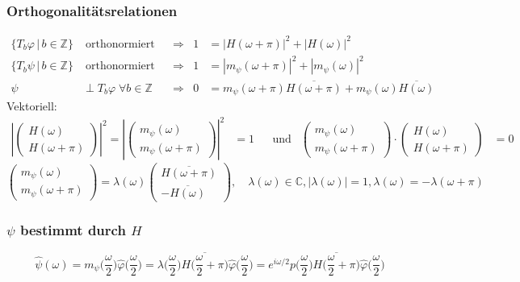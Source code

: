 %
%
%
\begin{frame}
\frametitle{Orthogonalitätsrelationen}
\begin{align*}
\{T_b\varphi\,|\,b\in\mathbb Z\}&\;\text{orthonormiert}
&&\Rightarrow&
1&=|H(\omega+\pi)|^2 + |H(\omega)|^2
\\
\{T_b\psi\,|\,b\in\mathbb Z\}&\;\text{orthonormiert}
&&\Rightarrow&
1&=|m_\psi(\omega+\pi)|^2 + |m_\psi(\omega)|^2
\\
\psi&\perp T_b\varphi
\;\forall b\in\mathbb Z
&&\Rightarrow&
0&=m_\psi(\omega+\pi) \overline{H(\omega+\pi)} + m_\psi(\omega)\overline{H(\omega)}
\end{align*}
Vektoriell:
\begin{align*}
\left|
\begin{pmatrix}
H(\omega)\\
H(\omega+\pi)
\end{pmatrix}
\right|^2
=
\left|
\begin{pmatrix}
m_\psi(\omega)\\
m_\psi(\omega+\pi)
\end{pmatrix}
\right|^2
&=
1
&&\text{und}
&
\begin{pmatrix}
m_\psi(\omega)\\
m_\psi(\omega+\pi)
\end{pmatrix}
\cdot
\begin{pmatrix}
H(\omega)\\
H(\omega+\pi)
\end{pmatrix}
&=
0
\end{align*}
\[
\begin{pmatrix}
m_\psi(\omega)\\
m_\psi(\omega+\pi)
\end{pmatrix}
=
\lambda(\omega)
\begin{pmatrix}
\overline{H(\omega+\pi)}\\
-\overline{H(\omega)}
\end{pmatrix},
\quad \lambda(\omega) \in\mathbb C, |\lambda(\omega)|=1,
\lambda(\omega)=-\lambda(\omega+\pi)
\]
\end{frame}


\begin{frame}
\frametitle{$\psi$ bestimmt durch $H$}
\[
\hat{\psi}(\omega)
=
m_\psi\biggl(\frac{\omega}2\biggr)
\hat{\varphi}\biggl(\frac{\omega}2\biggr)
=
\lambda\biggl(\frac{\omega}2\biggr)
\overline{H\biggl(\frac{\omega}2+\pi\biggr)}
\hat{\varphi}\biggl(\frac{\omega}2\biggr)
=
e^{i\omega/2}
p\biggl(\frac{\omega}2\biggr)
\overline{H\biggl(\frac{\omega}2+\pi\biggr)}
\hat{\varphi}\biggl(\frac{\omega}2\biggr)
\]


\end{frame}



